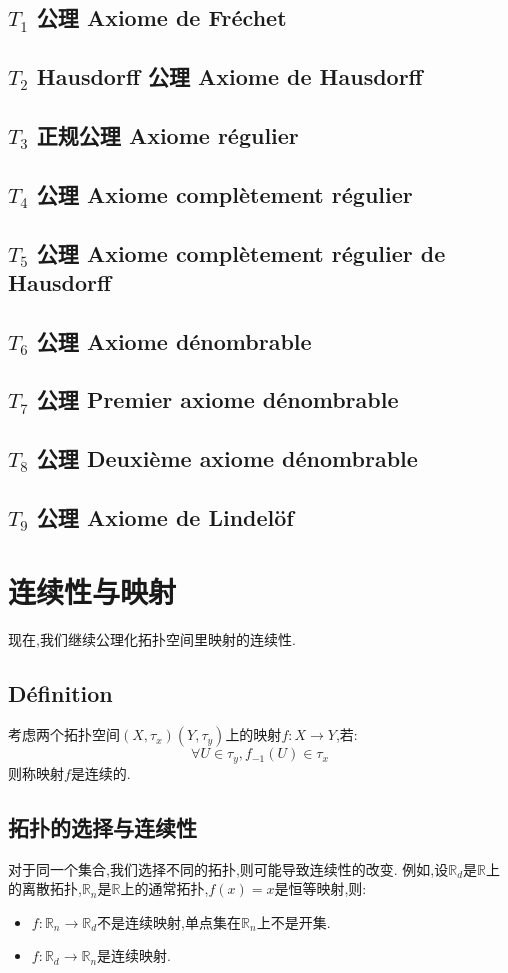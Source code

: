 \documentclass[12pt, a4paper, oneside]{ctexbook}
\newcommand{\R }{\mathbb{R}}%
\begin{document}
  \subsection{$T_1$ 公理 Axiome de Fréchet}
  \subsection{$T_2$ Hausdorff 公理 Axiome de Hausdorff}
  \subsection{$T_3$ 正规公理 Axiome régulier}
  \subsection{$T_4$ 公理 Axiome complètement régulier}
  \subsection{$T_5$ 公理 Axiome complètement régulier de Hausdorff}
  \subsection{$T_6$ 公理 Axiome dénombrable}
  \subsection{$T_7$ 公理 Premier axiome dénombrable}
  \subsection{$T_8$ 公理 Deuxième axiome dénombrable}
  \subsection{$T_9$ 公理 Axiome de Lindelöf}


\section{连续性与映射}
  现在,我们继续公理化拓扑空间里映射的连续性.
  \subsection{Définition}
  考虑两个拓扑空间$(X,\tau_x)(Y,\tau_y)$上的映射$f:X\rightarrow Y$,若:
  $$
  \forall U\in\tau_y,f_{-1}(U)\in\tau_x
  $$
  则称映射$f$是连续的.
  \subsection{拓扑的选择与连续性}
  对于同一个集合,我们选择不同的拓扑,则可能导致连续性的改变.
  例如,设$\R_d$是$\R$上的离散拓扑,$\R_n$是$\R$上的通常拓扑,$f(x)=x$是恒等映射,则:
  \begin{itemize}
    \item $f:\R_n\rightarrow \R_d$不是连续映射,单点集在$\R_n$上不是开集.
    \item $f:\R_d\rightarrow \R_n$是连续映射.
  \end{itemize}
\end{document}

